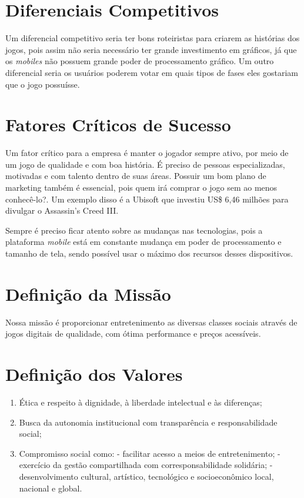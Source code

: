 \documentclass{abnt}
\begin{document}
	\chapter {Diferenciais Competitivos}
		Um diferencial competitivo seria ter bons roteiristas para criarem as histórias dos jogos, pois assim não seria necessário ter grande investimento em gráficos, já que os \textit{mobiles} não possuem grande poder de processamento gráfico.
		Um outro diferencial seria os usuários poderem votar em quais tipos de fases eles gostariam que o jogo possuísse.
	\chapter {Fatores Críticos de Sucesso}
		Um fator crítico para a empresa é manter o jogador sempre ativo, por meio de um jogo de qualidade e com boa história.
		É preciso de pessoas especializadas, motivadas e com talento dentro de suas áreas.
		Possuir um bom plano de marketing também é essencial, pois quem irá comprar o jogo sem ao menos conhecê-lo?. Um exemplo disso é a Ubisoft\textsuperscript{\texttrademark} que investiu US\$ 6,46 milhões para divulgar o Assassin's Creed III.
	
		Sempre é preciso ficar atento sobre as mudanças nas tecnologias, pois a plataforma \textit{mobile} está em constante mudança em poder de processamento e tamanho de tela, sendo possível usar o máximo dos recursos desses dispositivos. 

	\chapter {Definição da Missão}
	
		Nossa missão é proporcionar entretenimento as diversas classes sociais através 
		de jogos digitais de qualidade, com ótima performance e preços acessíveis.
	
	\chapter {Definição dos Valores}
	
		\begin{enumerate}
			\item Ética e respeito à dignidade, à liberdade intelectual e às diferenças;
			\item Busca da autonomia institucional com transparência e responsabilidade social;
			\item Compromisso social como:
				\subitem - facilitar acesso a meios de entretenimento;
				\subitem - exercício da gestão compartilhada com corresponsabilidade solidária;
				\subitem - desenvolvimento cultural, artístico, tecnológico e socioeconômico local, nacional e global.
		\end{enumerate}
			
\end{document}
